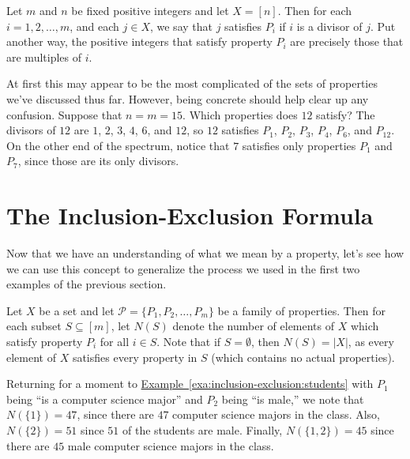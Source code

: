 \begin{example}\label{exa:inclusion-exclusion:prop-divis}
  Let $m$ and $n$ be fixed positive integers and let $X=[n]$.  Then
  for each $i=1,2,\dots,m$, and each $j\in X$, we say that $j$
  satisfies $P_i$ if $i$ is a divisor of $j$. Put another way, the
  positive integers that satisfy property $P_i$ are precisely those
  that are multiples of $i$.

  At first this may appear to be the most complicated of the sets of
  properties we've discussed thus far. However, being concrete should
  help clear up any confusion. Suppose that $n=m=15$. Which properties
  does $12$ satisfy? The divisors of $12$ are $1$, $2$, $3$, $4$, $6$,
  and $12$, so $12$ satisfies $P_1$, $P_2$, $P_3$, $P_4$, $P_6$, and
  $P_{12}$. On the other end of the spectrum, notice that $7$
  satisfies only properties $P_1$ and $P_7$, since those are its only
  divisors.
\end{example} 

\section{The Inclusion-Exclusion Formula}\label{s:inclusion-exclusion:statement}

Now that we have an understanding of what we mean by a property, let's
see how we can use this concept to generalize the process we used in
the first two examples of the previous section.

Let $X$ be a set and let $\mathcal{P}=\{P_1,P_2,\dots,P_m\}$ be a
family of properties. Then for each subset $S\subseteq [m]$, let
$N(S)$ denote the number of elements of $X$ which satisfy property
$P_i$ for all $i\in S$.  Note that if $S=\emptyset$, then $N(S)=|X|$,
as every element of $X$ satisfies every property in $S$ (which
contains no actual properties).

Returning for a moment to
\hyperref[exa:inclusion-exclusion:students]{Example~\ref*{exa:inclusion-exclusion:students}}
with $P_1$ being ``is a computer science major'' and $P_2$ being ``is
male,'' we note that $N(\{1\})=47$, since there are $47$ computer
science majors in the class. Also, $N(\{2\})=51$ since $51$ of the
students are male. Finally, $N(\{1,2\})=45$ since there are $45$ male
computer science majors in the class.

